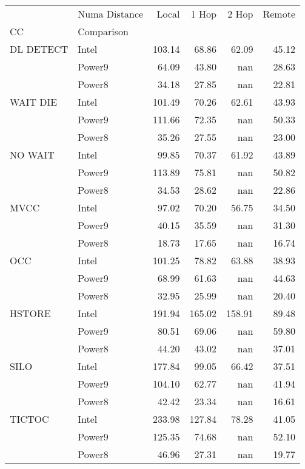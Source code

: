 \begin{tabular}{llrrrr}
\toprule
       & Numa Distance &  Local &  1 Hop &  2 Hop &  Remote \\
CC & Comparison &        &        &        &         \\
\midrule
DL DETECT & Intel & 103.14 &  68.86 &  62.09 &   45.12 \\
       & Power9 &  64.09 &  43.80 &    nan &   28.63 \\
       & Power8 &  34.18 &  27.85 &    nan &   22.81 \\
WAIT DIE & Intel & 101.49 &  70.26 &  62.61 &   43.93 \\
       & Power9 & 111.66 &  72.35 &    nan &   50.33 \\
       & Power8 &  35.26 &  27.55 &    nan &   23.00 \\
NO WAIT & Intel &  99.85 &  70.37 &  61.92 &   43.89 \\
       & Power9 & 113.89 &  75.81 &    nan &   50.82 \\
       & Power8 &  34.53 &  28.62 &    nan &   22.86 \\
MVCC & Intel &  97.02 &  70.20 &  56.75 &   34.50 \\
       & Power9 &  40.15 &  35.59 &    nan &   31.30 \\
       & Power8 &  18.73 &  17.65 &    nan &   16.74 \\
OCC & Intel & 101.25 &  78.82 &  63.88 &   38.93 \\
       & Power9 &  68.99 &  61.63 &    nan &   44.63 \\
       & Power8 &  32.95 &  25.99 &    nan &   20.40 \\
HSTORE & Intel & 191.94 & 165.02 & 158.91 &   89.48 \\
       & Power9 &  80.51 &  69.06 &    nan &   59.80 \\
       & Power8 &  44.20 &  43.02 &    nan &   37.01 \\
SILO & Intel & 177.84 &  99.05 &  66.42 &   37.51 \\
       & Power9 & 104.10 &  62.77 &    nan &   41.94 \\
       & Power8 &  42.42 &  23.34 &    nan &   16.61 \\
TICTOC & Intel & 233.98 & 127.84 &  78.28 &   41.05 \\
       & Power9 & 125.35 &  74.68 &    nan &   52.10 \\
       & Power8 &  46.96 &  27.31 &    nan &   19.77 \\
\bottomrule
\end{tabular}
